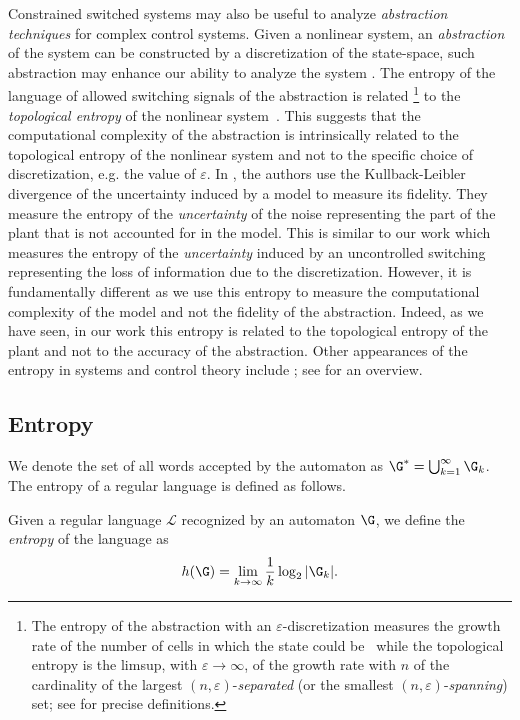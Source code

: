 \documentclass[11pt,twoside,a4paper,openright]{uclouvain-thesis}
\newcommand{\Paths}{\G_k}
\newcommand{\Lang}{\mathcal{L}}
\newcommand{\LangAutom}[1][\G]{{#1}^*}
\begin{document}
Constrained switched systems may also be useful to analyze \emph{abstraction techniques} for complex control systems.
Given a nonlinear system, an \emph{abstraction} of the system can be constructed by
a discretization of the state-space,
such abstraction may enhance our ability to analyze the system \cite{tabuada2009verification}.
The entropy of the language of allowed switching signals of the abstraction is related%
\footnote{The entropy of the abstraction with an $\varepsilon$-discretization measures the growth rate of the number
of cells in which the state could be~\cite[Example~6.3.4]{lind1995introduction}
while the topological entropy is the limsup,
with $\varepsilon \to \infty$, of the growth rate with $n$ of the cardinality of
the largest $(n, \varepsilon)$-\emph{separated} (or the smallest $(n, \varepsilon)$-\emph{spanning}) set;
see \cite{bowen1971entropy} for precise definitions.}
to the \emph{topological entropy} of the nonlinear system~\cite{adler1965topological, bowen1971entropy}.
This suggests that the computational complexity of the abstraction is intrinsically related to
the topological entropy of the nonlinear system and not to the specific choice
of discretization, e.g. the value of $\varepsilon$.
In \cite{yu2010kullback}, the authors use the Kullback-Leibler divergence of the uncertainty induced by a model to measure its fidelity.
They measure the entropy of the \emph{uncertainty} of the noise representing the part of the plant that is not accounted for in the model.
This is similar to our work which
measures the entropy of the \emph{uncertainty} induced by an uncontrolled switching
representing the loss of information due to the discretization.
However, it is fundamentally different as we use this entropy to measure the computational complexity
of the model and not the fidelity of the abstraction.
Indeed, as we have seen, in our work this entropy is related to the topological entropy of the plant and
not to the accuracy of the abstraction.
Other appearances of the entropy in systems and control theory include \cite{byrnes2001generalized, ferrante2008hellinger}; see \cite{pavon2013geometry} for an overview.



\subsection{Entropy}
\label{sec:entropy}

We denote the set of all words accepted by the automaton as $\LangAutom = \bigcup_{k=1}^\infty \G_k$.
The entropy of a regular language is defined as follows.
\begin{mydef}
  \label{def:entropy}
    Given a regular language $\Lang$ recognized by an automaton $\G$,
    we define the \emph{entropy} of the language as
    \begin{equation}
      \label{eq:hG}
      h(\G) = \lim_{k \to \infty} \frac{1}{k} \log_2|\Paths|.
    \end{equation}
\end{mydef}
\end{document}
